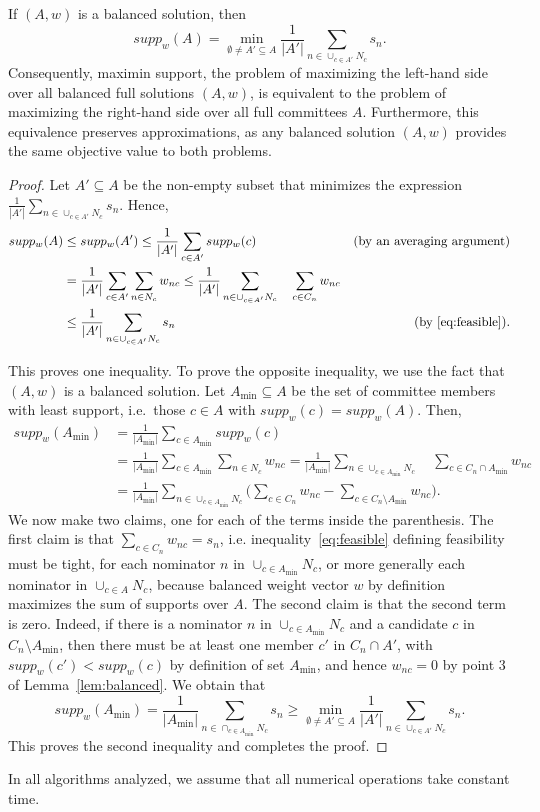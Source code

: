 \begin{lemma} \label{lem:maximin-support-eqiv} If $(A,w)$ is a balanced solution, then
$$supp_w(A) = \min_{\emptyset\neq A' \subseteq A} \frac{1}{|A'|} \sum_{n\in \cup_{c\in A'} N_c} s_n.$$
Consequently, maximin support, the problem of maximizing the left-hand side over all balanced full solutions $(A,w)$, is equivalent to the problem of maximizing the right-hand side over all full committees $A$. 
Furthermore, this equivalence preserves approximations, as any balanced solution $(A,w)$ provides the same objective value to both problems.
\end{lemma}

\begin{proof}
Let $A'\subseteq A$ be the non-empty subset that minimizes the expression $\frac{1}{|A'|} \sum_{n\in \cup_{c\in A'} N_c} s_n$. Hence, 
\begin{align*}
    supp_w(A) &\leq supp_w(A') \leq \frac{1}{|A'|} \sum_{c\in A'} supp_w(c) &\text{(by an averaging argument)}\\
    & = \frac{1}{|A'|} \sum_{c\in A'} \sum_{n\in N_c} w_{nc} 
     \leq \frac{1}{|A'|}  \sum_{n\in \cup_{c\in A'} N_c} \quad \sum_{c\in C_n} w_{nc} \\
    & \leq \frac{1}{|A'|} \sum_{n\in \cup_{c\in A'} N_c} s_n &\text{(by \ref{eq:feasible})}.
\end{align*}

This proves one inequality. To prove the opposite inequality, we use the fact that $(A,w)$ is a balanced solution. 
Let $A_{\min}\subseteq A$ be the set of committee members with least support, i.e.~those $c\in A$ with $supp_w(c)=supp_w(A)$. Then,
\begin{align*}
    supp_w(A_{\min}) &= \frac{1}{|A_{\min}|} \sum_{c\in A_{\min}} supp_w(c) \\
    &= \frac{1}{|A_{\min}|} \sum_{c\in A_{\min}} \sum_{n\in N_c} w_{nc} 
    = \frac{1}{|A_{\min}|} \sum_{n\in \cup_{c\in A_{\min}} N_c} \quad \sum_{c\in C_n\cap A_{\min}} w_{nc} \\
    &= \frac{1}{|A_{\min}|} \sum_{n\in \cup_{c\in A_{\min}} N_c} \Big( \sum_{c\in C_n} w_{nc} - \sum_{c\in C_n \setminus A_{\min}} w_{nc}\Big).
\end{align*}
We now make two claims, one for each of the terms inside the parenthesis. The first claim is that $\sum_{c\in C_n} w_{nc}=s_n$, i.e. inequality~\eqref{eq:feasible} defining feasibility must be tight, for each nominator $n$ in $\cup_{c\in A_{\min}} N_c$, or more generally each nominator in $\cup_{c\in A} N_c$, because balanced weight vector $w$ by definition maximizes the sum of supports over $A$. The second claim is that the second term is zero. Indeed, if there is a nominator $n$ in $\cup_{c\in A_{\min}} N_c$ and a candidate $c$ in $C_n\setminus A_{\min}$, then there must be at least one member $c'$ in $C_n\cap A'$, with $supp_w(c')<supp_w(c)$ by definition of set $A_{\min}$, and hence $w_{nc}=0$ by point 3 of Lemma~\ref{lem:balanced}. 
We obtain that 
$$supp_w(A_{\min}) = \frac{1}{|A_{\min}|}\sum_{n\in \cap_{c\in A_{\min}} N_c} s_n \geq \min_{\emptyset\neq A'\subseteq A} \frac{1}{|A'|}\sum_{n\in \cup_{c\in A'}N_c} s_n.$$
This proves the second inequality and completes the proof.
\end{proof}

\begin{remark}
In all algorithms analyzed, we assume that all numerical operations take constant time.
\end{remark}
